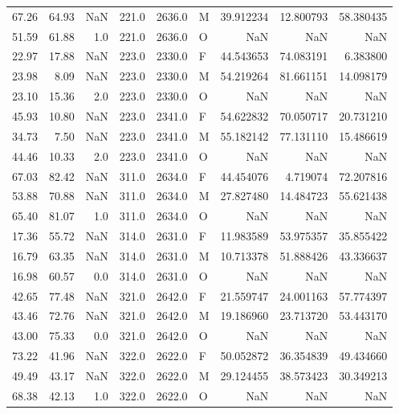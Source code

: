\begin{table}
\begin{tabular}{rrrrrlrrr}
67.26 &  64.93 &      NaN &  221.0 & 2636.0 &      M & 39.912234 & 12.800793 & 58.380435 \\
51.59 &  61.88 &      1.0 &  221.0 & 2636.0 &      O &       NaN &       NaN &       NaN \\
22.97 &  17.88 &      NaN &  223.0 & 2330.0 &      F & 44.543653 & 74.083191 &  6.383800 \\
23.98 &   8.09 &      NaN &  223.0 & 2330.0 &      M & 54.219264 & 81.661151 & 14.098179 \\
23.10 &  15.36 &      2.0 &  223.0 & 2330.0 &      O &       NaN &       NaN &       NaN \\
45.93 &  10.80 &      NaN &  223.0 & 2341.0 &      F & 54.622832 & 70.050717 & 20.731210 \\
34.73 &   7.50 &      NaN &  223.0 & 2341.0 &      M & 55.182142 & 77.131110 & 15.486619 \\
44.46 &  10.33 &      2.0 &  223.0 & 2341.0 &      O &       NaN &       NaN &       NaN \\
67.03 &  82.42 &      NaN &  311.0 & 2634.0 &      F & 44.454076 &  4.719074 & 72.207816 \\
53.88 &  70.88 &      NaN &  311.0 & 2634.0 &      M & 27.827480 & 14.484723 & 55.621438 \\
65.40 &  81.07 &      1.0 &  311.0 & 2634.0 &      O &       NaN &       NaN &       NaN \\
17.36 &  55.72 &      NaN &  314.0 & 2631.0 &      F & 11.983589 & 53.975357 & 35.855422 \\
16.79 &  63.35 &      NaN &  314.0 & 2631.0 &      M & 10.713378 & 51.888426 & 43.336637 \\
16.98 &  60.57 &      0.0 &  314.0 & 2631.0 &      O &       NaN &       NaN &       NaN \\
42.65 &  77.48 &      NaN &  321.0 & 2642.0 &      F & 21.559747 & 24.001163 & 57.774397 \\
43.46 &  72.76 &      NaN &  321.0 & 2642.0 &      M & 19.186960 & 23.713720 & 53.443170 \\
43.00 &  75.33 &      0.0 &  321.0 & 2642.0 &      O &       NaN &       NaN &       NaN \\
73.22 &  41.96 &      NaN &  322.0 & 2622.0 &      F & 50.052872 & 36.354839 & 49.434660 \\
49.49 &  43.17 &      NaN &  322.0 & 2622.0 &      M & 29.124455 & 38.573423 & 30.349213 \\
68.38 &  42.13 &      1.0 &  322.0 & 2622.0 &      O &       NaN &       NaN &       NaN \\

\end{tabular}
\end{table}
